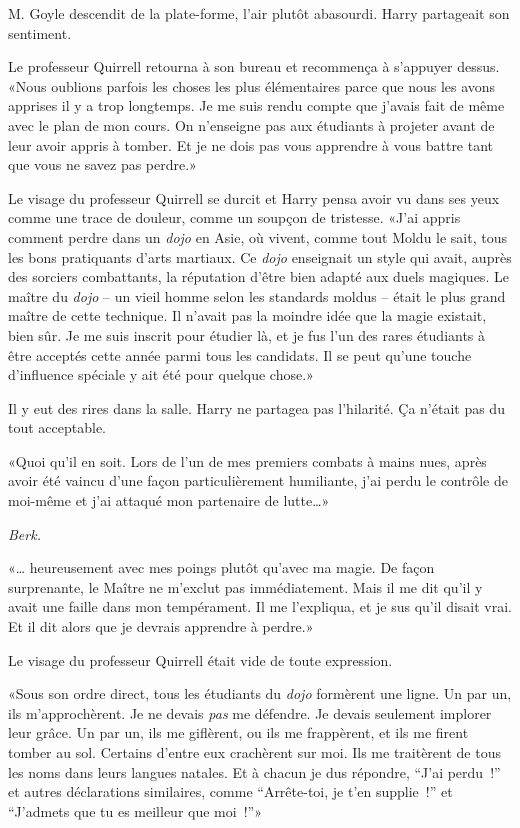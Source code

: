 M. Goyle descendit de la plate-forme, l'air plutôt abasourdi. Harry partageait son sentiment.

Le professeur Quirrell retourna à son bureau et recommença à s'appuyer dessus. «Nous oublions parfois les choses les plus élémentaires parce que nous les avons apprises il y a trop longtemps. Je me suis rendu compte que j'avais fait de même avec le plan de mon cours. On n'enseigne pas aux étudiants à projeter avant de leur avoir appris à tomber. Et je ne dois pas vous apprendre à vous battre tant que vous ne savez pas perdre.»

Le visage du professeur Quirrell se durcit et Harry pensa avoir vu dans ses yeux comme une trace de douleur, comme un soupçon de tristesse. «J'ai appris comment perdre dans un \emph{dojo} en Asie, où vivent, comme tout Moldu le sait, tous les bons pratiquants d'arts martiaux. Ce \emph{dojo} enseignait un style qui avait, auprès des sorciers combattants, la réputation d'être bien adapté aux duels magiques. Le maître du \emph{dojo} -- un vieil homme selon les standards moldus -- était le plus grand maître de cette technique. Il n'avait pas la moindre idée que la magie existait, bien sûr. Je me suis inscrit pour étudier là, et je fus l'un des rares étudiants à être acceptés cette année parmi tous les candidats. Il se peut qu'une touche d'influence spéciale y ait été pour quelque chose.»

Il y eut des rires dans la salle. Harry ne partagea pas l'hilarité. Ça n'était pas du tout acceptable.

«Quoi qu'il en soit. Lors de l'un de mes premiers combats à mains nues, après avoir été vaincu d'une façon particulièrement humiliante, j'ai perdu le contrôle de moi-même et j'ai attaqué mon partenaire de lutte…»

\emph{Berk.}

«… heureusement avec mes poings plutôt qu'avec ma magie. De façon surprenante, le Maître ne m'exclut pas immédiatement. Mais il me dit qu'il y avait une faille dans mon tempérament. Il me l'expliqua, et je sus qu'il disait vrai. Et il dit alors que je devrais apprendre à perdre.»

Le visage du professeur Quirrell était vide de toute expression.

«Sous son ordre direct, tous les étudiants du \emph{dojo} formèrent une ligne. Un par un, ils m'approchèrent. Je ne devais \emph{pas} me défendre. Je devais seulement implorer leur grâce. Un par un, ils me giflèrent, ou ils me frappèrent, et ils me firent tomber au sol. Certains d'entre eux crachèrent sur moi. Ils me traitèrent de tous les noms dans leurs langues natales. Et à chacun je dus répondre, “J'ai perdu~!” et autres déclarations similaires, comme “Arrête-toi, je t'en supplie~!” et “J'admets que tu es meilleur que moi~!”»

